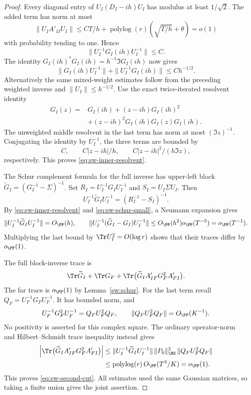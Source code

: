 \begin{proof}
Every diagonal entry of \(U_I(D_I-ih)U_I\) has modulus at least
\(1/\sqrt2\). The added term has norm at most
\[
 \|U_IA'_{II}U_I\|
 \le C T/h+\operatorname{polylog}(r)
       \left(\sqrt{T/h}+\theta\right)=o(1)
\]
with probability tending to one. Hence
\[
 \|U_I^{-1}G_I(ih)U_I^{-1}\|\le C.
\]
The identity \(G_I(ih)^*G_I(ih)=h^{-1}\Im G_I(ih)\) now gives
\[
 \|G_I(ih)U_I^{-1}\|+\|U_I^{-1}G_I(ih)\|
 \le C h^{-1/2}.
\]
Alternatively the same mixed-weight estimates follow from the preceding
weighted inverse and \(\|U_I\|\le h^{-1/2}\).
Use the exact twice-iterated resolvent identity
\begin{align*}
 G_I(z)
 ={}&G_I(ih)+(z-ih)G_I(ih)^2\\
 &+(z-ih)^2G_I(ih)G_I(z)G_I(ih).
\end{align*}
The unweighted middle resolvent in the last term has norm at most
\((\Im z)^{-1}\). Conjugating the identity by \(U_I^{-1}\), the three
terms are bounded by
\[
 C,\qquad C|z-ih|/h,\qquad
 C|z-ih|^2/(h\Im z),
\]
respectively. This proves \eqref{eq:sw-inner-resolvent}.

The Schur complement formula for the full inverse has upper-left block
\(\widetilde G_I=(G_I^{-1}-\Sigma)^{-1}\).
Set \(R_I=U_I^{-1}G_IU_I^{-1}\) and \(S_I=U_I\Sigma U_I\).
Then
\[
 U_I^{-1}\widetilde G_IU_I^{-1}
 =(R_I^{-1}-S_I)^{-1}.
\]
By \eqref{eq:sw-inner-resolvent} and
\eqref{eq:sw-schur-small}, a Neumann expansion gives
\[
 \|U_I^{-1}\widetilde G_IU_I^{-1}\|=O_{\PP}(h),\qquad
 \|U_I^{-1}(\widetilde G_I-G_I)U_I^{-1}\|
 \le O_{\PP}(h^2)o_{\PP}(T^{-5})=o_{\PP}(T^{-1}).
\]
Multiplying the last bound by \(\Tr U_I^2=O(\log r)\) shows that their
traces differ by \(o_{\PP}(1)\).

The full block-inverse trace is
\[
 \Tr\widetilde G_I+\Tr G_F+
 \Tr\bigl(\widetilde G_IA'_{IF}G_F^2A'_{FI}\bigr).
\]
The far trace is \(o_{\PP}(1)\) by Lemma~\ref{sw:schur}.
For the last term recall \(Q_F=U_F^{-1}G_FU_F^{-1}\).
It has bounded norm, and
\[
 U_F^{-1}G_F^2U_F^{-1}=Q_FU_F^2Q_F,\qquad
 \|Q_FU_F^2Q_F\|=O_{\PP}(K^{-1}).
\]
No positivity is asserted for this complex square. The ordinary
operator-norm and Hilbert--Schmidt trace inequality instead gives
\begin{align*}
 \left|\Tr\bigl(\widetilde G_IA'_{IF}G_F^2A'_{FI}\bigr)\right|
 &\le
 \|U_I^{-1}\widetilde G_IU_I^{-1}\|\,
 \|P_0\|_{\HS}^2\,
 \|Q_FU_F^2Q_F\|\\
 &\le \operatorname{polylog}(r)\,O_{\PP}(T^3/K)=o_{\PP}(1).
\end{align*}
This proves \eqref{eq:sw-second-cut}. All estimates used the same Gaussian
matrices, so taking a finite union gives the joint assertion.
\end{proof}

